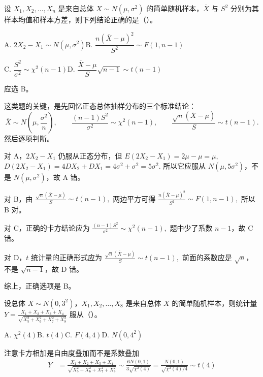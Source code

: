 \documentclass[lang=cn,11pt]{elegantbook}
\begin{document}
\begin{exercise}\label{exer:6-normal-judge}
设 \(X_1, X_2, \dots, X_n\) 是来自总体 \(X \sim N(\mu, \sigma^2)\) 的简单随机样本，\(\overline{X}\) 与 \(S^2\) 分别为其样本均值和样本方差，则下列结论正确的是（\quad）。\par
A. \(2X_2 - X_1 \sim N(\mu, \sigma^2)\)\quad B. \(\dfrac{n(\overline{X}-\mu)^2}{S^2} \sim F(1,n-1)\)\par
C. \(\dfrac{S^2}{\sigma^2} \sim \chi^2(n-1)\)\quad D. \(\dfrac{\overline{X}-\mu}{S}\sqrt{n-1} \sim t(n-1)\)
\end{exercise}
\begin{solution}
应选 B。

这类题的关键，是先回忆正态总体抽样分布的三个标准结论：
\[
\overline{X}\sim N\!\left(\mu,\frac{\sigma^2}{n}\right),\qquad
\frac{(n-1)S^2}{\sigma^2}\sim\chi^2(n-1),\qquad
\frac{\sqrt{n}(\overline{X}-\mu)}{S}\sim t(n-1).
\]
然后逐项判断。

对 A，\(2X_2-X_1\) 仍服从正态分布，但
\(
E(2X_2-X_1)=2\mu-\mu=\mu,
\)
\(
D(2X_2-X_1)=4DX_2+DX_1=4\sigma^2+\sigma^2=5\sigma^2.
\)
所以它应服从 \(N(\mu,5\sigma^2)\)，不是 \(N(\mu,\sigma^2)\)，故 A 错。

对 B，由
\(
\frac{\sqrt{n}(\overline{X}-\mu)}{S}\sim t(n-1),
\)
两边平方可得
\(
\frac{n(\overline{X}-\mu)^2}{S^2}\sim F(1,n-1),
\)
所以 B 对。

对 C，正确的卡方结论应为
\(
\frac{(n-1)S^2}{\sigma^2}\sim\chi^2(n-1),
\)
题中少了系数 \(n-1\)，故 C 错。

对 D，\(t\) 统计量的正确形式应为
\(
\frac{\sqrt{n}(\overline{X}-\mu)}{S}\sim t(n-1),
\)
前面的系数应是 \(\sqrt{n}\)，不是 \(\sqrt{n-1}\)，故 D 错。

综上，正确选项是 B。
\end{solution}


\begin{exercise}\label{exer:6-y-t-dist}
设总体 \(X \sim N(0, 3^2)\)，\(X_1, X_2, \dots, X_8\) 是来自总体 \(X\) 的简单随机样本，则统计量
\(
Y = \frac{X_1 + X_2 + X_3 + X_4}{\sqrt{X_5^2 + X_6^2 + X_7^2 + X_8^2}}
\)
服从（\quad）。\par
A. \(\chi^2(4)\)\quad B. \(t(4)\)\quad C. \(F(4,4)\)\quad D. \(N(0, 4^2)\)
\end{exercise}

\begin{solution}
注意卡方相加是自由度叠加而不是系数叠加
\begin{align*}
Y &= \frac{X_1 + X_2 + X_3 + X_4}{\sqrt{X_5^2 + X_6^2 + X_7^2 + X_8^2}}\sim \frac{6N(0,1)}{3\sqrt{\chi^2(4)}}=\frac{N(0,1)}{\sqrt{\chi^2(4)/4}}\sim t(4)
\end{align*}
\end{solution}
\end{document}
